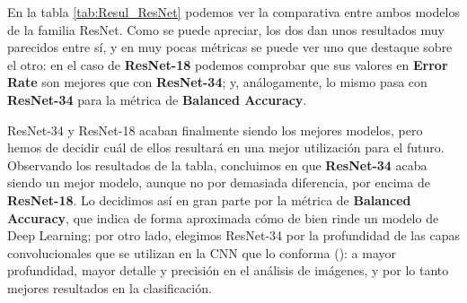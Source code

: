 \begin{table}[H]
\centering
{}
\caption{Resultados de ResNet-34 y ResNet-18}
\label{tab:Resul_ResNet}
\end{table}

En la tabla \ref{tab:Resul_ResNet} podemos ver la comparativa entre ambos modelos de la familia ResNet. Como se puede apreciar, los dos dan unos resultados muy parecidos entre sí, y en muy pocas métricas se puede ver uno que destaque sobre el otro: en el caso de \textbf{ResNet-18} podemos comprobar que sus valores en \textbf{Error Rate} son mejores que con \textbf{ResNet-34}; y, análogamente, lo mismo pasa con \textbf{ResNet-34} para la métrica de \textbf{Balanced Accuracy}.

ResNet-34 y ResNet-18 acaban finalmente siendo los mejores modelos, pero hemos de decidir cuál de ellos resultará en una mejor utilización para el futuro. Observando los resultados de la tabla, concluimos en que \textbf{ResNet-34} acaba siendo un mejor modelo, aunque no por demasiada diferencia, por encima de \textbf{ResNet-18}. Lo decidimos así en gran parte por la métrica de \textbf{Balanced Accuracy}, que indica de forma aproximada cómo de bien rinde un modelo de Deep Learning; por otro lado, elegimos ResNet-34 por la profundidad de las capas convolucionales que se utilizan en la \ac{CNN} que lo conforma (\cite{cnn}): a mayor profundidad, mayor detalle y precisión en el análisis de imágenes, y por lo tanto mejores resultados en la clasificación.

